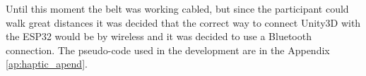  Until this moment the belt was working cabled, but since the participant could walk great distances it was decided that the correct way to connect Unity3D with the ESP32 would be by wireless and it was decided to use a Bluetooth connection. The pseudo-code used in the development are in the Appendix \ref{ap:haptic_apend}.
